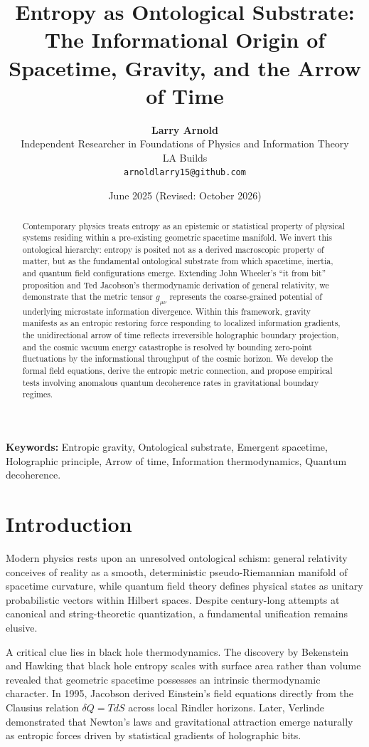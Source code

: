 \documentclass[11pt,a4paper]{article}
\title{\textbf{Entropy as Ontological Substrate:\\The Informational Origin of Spacetime, Gravity, and the Arrow of Time}}
\author{
    \textbf{Larry Arnold}\\
    Independent Researcher in Foundations of Physics and Information Theory\\
    LA Builds\\
    \texttt{arnoldlarry15@github.com}
}
\date{June 2025 (Revised: October 2026)}
\begin{document}
\maketitle

\begin{abstract}
Contemporary physics treats entropy as an epistemic or statistical property of physical systems residing within a pre-existing geometric spacetime manifold. We invert this ontological hierarchy: entropy is posited not as a derived macroscopic property of matter, but as the fundamental ontological substrate from which spacetime, inertia, and quantum field configurations emerge. Extending John Wheeler's ``it from bit'' proposition and Ted Jacobson's thermodynamic derivation of general relativity, we demonstrate that the metric tensor $g_{\mu\nu}$ represents the coarse-grained potential of underlying microstate information divergence. Within this framework, gravity manifests as an entropic restoring force responding to localized information gradients, the unidirectional arrow of time reflects irreversible holographic boundary projection, and the cosmic vacuum energy catastrophe is resolved by bounding zero-point fluctuations by the informational throughput of the cosmic horizon. We develop the formal field equations, derive the entropic metric connection, and propose empirical tests involving anomalous quantum decoherence rates in gravitational boundary regimes.
\end{abstract}

\vspace{1em}
\noindent \textbf{Keywords:} Entropic gravity, Ontological substrate, Emergent spacetime, Holographic principle, Arrow of time, Information thermodynamics, Quantum decoherence.

\section{Introduction}
Modern physics rests upon an unresolved ontological schism: general relativity conceives of reality as a smooth, deterministic pseudo-Riemannian manifold of spacetime curvature, while quantum field theory defines physical states as unitary probabilistic vectors within Hilbert spaces. Despite century-long attempts at canonical and string-theoretic quantization, a fundamental unification remains elusive.

A critical clue lies in black hole thermodynamics. The discovery by Bekenstein \cite{bekenstein1973black} and Hawking that black hole entropy scales with surface area rather than volume revealed that geometric spacetime possesses an intrinsic thermodynamic character. In 1995, Jacobson \cite{jacobson1995thermodynamics} derived Einstein's field equations directly from the Clausius relation $\delta Q = T dS$ across local Rindler horizons. Later, Verlinde \cite{verlinde2011origin} demonstrated that Newton's laws and gravitational attraction emerge naturally as entropic forces driven by statistical gradients of holographic bits.
\end{document}
